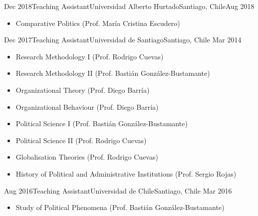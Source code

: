 





\begin{experiences}
  \experience
    {Dec 2018}{Teaching Assistant}{Universidad Alberto Hurtado}{Santiago, Chile}{Aug 2018}
    {\begin{itemize}
    \item Comparative Politics {\small (Prof. María Cristina Escudero)}
    \end{itemize}}
    {}
\end{experiences}
\vspace{-2mm}

\begin{experiences}
  \emptySeparator 
  \experience 
    {Dec 2017}{Teaching Assistant}{Universidad de Santiago}{Santiago, Chile} {Mar 2014}
    {\begin{itemize}
    \item Research Methodology I {\small (Prof. Rodrigo Cuevas)}
    \item Research Methodology II {\small (Prof. Bastián González-Bustamante)}
    \item Organizational Theory {\small (Prof. Diego Barría)}
    \item Organizational Behaviour {\small (Prof. Diego Barría)}
    \item Political Science I {\small (Prof. Bastián González-Bustamante)}
    \item Political Science II {\small (Prof. Rodrigo Cuevas)}
	\item Globalisation Theories {\small (Prof. Rodrigo Cuevas)}
	\item History of Political and Administrative Institutions {\small (Prof. Sergio Rojas)}
    \end{itemize}}
    {}
\end{experiences}
\vspace{-2mm}

\begin{experiences}
  \emptySeparator 
  \experience 
    {Aug 2016}{Teaching Assistant}{Universidad de Chile}{Santiago, Chile} {Mar 2016}
    {\begin{itemize}
    \item Study of Political Phenomena {\small (Prof. Bastián González-Bustamante)}
    \end{itemize}}
    {}
\end{experiences}
